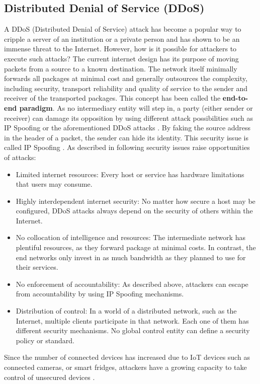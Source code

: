 \subsection{Distributed Denial of Service (DDoS)}
\label{subsec:03_ddos}

A DDoS (Distributed Denial of Service) attack has become a popular way to cripple a server of an institution or a private person and has shown to be an immense threat to the Internet. However, how is it possible for attackers to execute such attacks? The current internet design has its purpose of moving packets from a source to a known destination. The network itself minimally forwards all packages at minimal cost and generally outsources the complexity, including security, transport reliability and quality of service to the sender and receiver of the transported packages. This concept has been called the \textbf{end-to-end paradigm}. As no intermediary entity will step in, a party (either sender or receiver) can damage its opposition by using different attack possibilities such as IP Spoofing or the aforementioned DDoS attacks \cite{Mirkovic2004}. By faking the source address in the header of a packet, the sender can hide its identity. This security issue is called IP Spoofing \cite{Cloudflare2019}. As described in \citet{Mirkovic2004} following security issues raise opportunities of attacks:
\begin{itemize}
    \item Limited internet resources: Every host or service has hardware limitations that users may consume.
    \item Highly interdependent internet security: No matter how secure a host may be configured, DDoS attacks always depend on the security of others within the Internet.
    \item No collocation of intelligence and resources: The intermediate network has plentiful resources, as they forward package at minimal costs.  In contrast, the end networks only invest in as much bandwidth as they planned to use for their services.
    \item No enforcement of accountability: As described above, attackers can escape from accountability by using IP Spoofing mechanisms.
    \item Distribution of control: In a world of a distributed network, such as the Internet, multiple clients participate in that network. Each one of them has different security mechanisms. No global control entity can define a security policy or standard.
\end{itemize}
Since the number of connected devices has increased due to IoT devices such as connected cameras, or smart fridges, attackers have a growing capacity to take control of unsecured devices \cite{Rodrigues2017a}.

